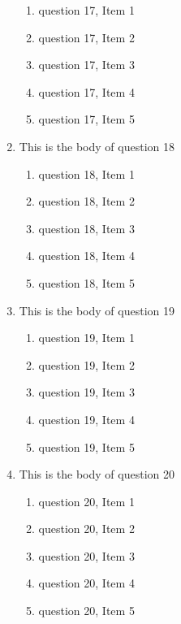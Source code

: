 \documentclass{article}
\begin{document}
\begin{enumerate}
    \begin{enumerate}
    \item
    question 17, Item 1
    \item
    question 17, Item 2
    \item
    question 17, Item 3
    \item
    question 17, Item 4
    \item
    question 17, Item 5
    \end{enumerate}
\item
This is the body of question 18
    \begin{enumerate}
    \item
    question 18, Item 1
    \item
    question 18, Item 2
    \item
    question 18, Item 3
    \item
    question 18, Item 4
    \item
    question 18, Item 5
    \end{enumerate}
\item
This is the body of question 19
    \begin{enumerate}
    \item
    question 19, Item 1
    \item
    question 19, Item 2
    \item
    question 19, Item 3
    \item
    question 19, Item 4
    \item
    question 19, Item 5
    \end{enumerate}
\item
This is the body of question 20
    \begin{enumerate}
    \item
    question 20, Item 1
    \item
    question 20, Item 2
    \item
    question 20, Item 3
    \item
    question 20, Item 4
    \item
    question 20, Item 5
    \end{enumerate}
\end{enumerate} %
\end{document}
